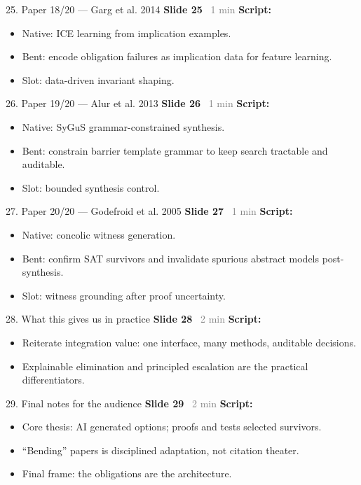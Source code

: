 \documentclass[aspectratio=169]{beamer}
\newcommand{\syncline}[2]{\textbf{#1} \hfill \textcolor{gray}{#2}}
\begin{document}
\begin{frame}[shrink=18]{25. Paper 18/20 — Garg et al. 2014}
\syncline{Slide 25}{~1 min}
\textbf{Script:}
\begin{itemize}
  \item Native: ICE learning from implication examples.
  \item Bent: encode obligation failures as implication data for feature learning.
  \item Slot: data-driven invariant shaping.
\end{itemize}
\end{frame}

\begin{frame}[shrink=18]{26. Paper 19/20 — Alur et al. 2013}
\syncline{Slide 26}{~1 min}
\textbf{Script:}
\begin{itemize}
  \item Native: SyGuS grammar-constrained synthesis.
  \item Bent: constrain barrier template grammar to keep search tractable and auditable.
  \item Slot: bounded synthesis control.
\end{itemize}
\end{frame}

\begin{frame}[shrink=18]{27. Paper 20/20 — Godefroid et al. 2005}
\syncline{Slide 27}{~1 min}
\textbf{Script:}
\begin{itemize}
  \item Native: concolic witness generation.
  \item Bent: confirm SAT survivors and invalidate spurious abstract models post-synthesis.
  \item Slot: witness grounding after proof uncertainty.
\end{itemize}
\end{frame}

\begin{frame}{28. What this gives us in practice}
\syncline{Slide 28}{~2 min}
\textbf{Script:}
\begin{itemize}
  \item Reiterate integration value: one interface, many methods, auditable decisions.
  \item Explainable elimination and principled escalation are the practical differentiators.
\end{itemize}
\end{frame}

\begin{frame}{29. Final notes for the audience}
\syncline{Slide 29}{~2 min}
\textbf{Script:}
\begin{itemize}
  \item Core thesis: AI generated options; proofs and tests selected survivors.
  \item ``Bending'' papers is disciplined adaptation, not citation theater.
  \item Final frame: the obligations are the architecture.
\end{itemize}
\end{frame}
\end{document}
